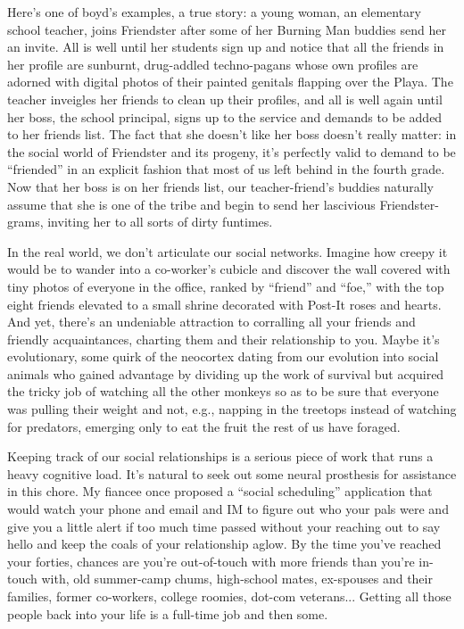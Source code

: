 Here's one of boyd's examples, a true story: a young woman, an
elementary school teacher, joins Friendster after some of her
Burning Man buddies send her an invite. All is well until her
students sign up and notice that all the friends in her profile are
sunburnt, drug-addled techno-pagans whose own profiles are adorned
with digital photos of their painted genitals flapping over the
Playa. The teacher inveigles her friends to clean up their
profiles, and all is well again until her boss, the school
principal, signs up to the service and demands to be added to her
friends list. The fact that she doesn't like her boss doesn't
really matter: in the social world of Friendster and its progeny,
it's perfectly valid to demand to be ``friended'' in an explicit
fashion that most of us left behind in the fourth grade. Now that
her boss is on her friends list, our teacher-friend's buddies
naturally assume that she is one of the tribe and begin to send her
lascivious Friendster-grams, inviting her to all sorts of dirty
funtimes.

In the real world, we don't articulate our social networks. Imagine
how creepy it would be to wander into a co-worker's cubicle and
discover the wall covered with tiny photos of everyone in the
office, ranked by ``friend'' and ``foe,'' with the top eight friends
elevated to a small shrine decorated with Post-It roses and hearts.
And yet, there's an undeniable attraction to corralling all your
friends and friendly acquaintances, charting them and their
relationship to you. Maybe it's evolutionary, some quirk of the
neocortex dating from our evolution into social animals who gained
advantage by dividing up the work of survival but acquired the
tricky job of watching all the other monkeys so as to be sure that
everyone was pulling their weight and not, e.g., napping in the
treetops instead of watching for predators, emerging only to eat
the fruit the rest of us have foraged.

Keeping track of our social relationships is a serious piece of
work that runs a heavy cognitive load. It's natural to seek out
some neural prosthesis for assistance in this chore. My fiancee
once proposed a ``social scheduling'' application that would watch
your phone and email and IM to figure out who your pals were and
give you a little alert if too much time passed without your
reaching out to say hello and keep the coals of your relationship
aglow. By the time you've reached your forties, chances are you're
out-of-touch with more friends than you're in-touch with, old
summer-camp chums, high-school mates, ex-spouses and their
families, former co-workers, college roomies, dot-com veterans...
Getting all those people back into your life is a full-time job and
then some.

